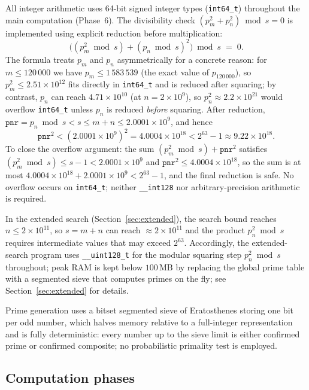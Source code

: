 \documentclass{amsart}
\theoremstyle{definition}
\theoremstyle{remark}
\numberwithin{equation}{section}
\begin{document}
All integer arithmetic uses 64-bit signed integer types
(\texttt{int64\_t}) throughout the main computation (Phase~6).
The divisibility check $(p_m^2 + p_n^2) \bmod s = 0$ is implemented
using explicit reduction before multiplication:
\[
\bigl((p_m^2 \bmod s) + (p_n \bmod s)^2\bigr) \bmod s \;=\; 0.
\]
The formula treats $p_m$ and $p_n$ asymmetrically for a concrete
reason: for $m \leq 120\,000$ we have $p_m \leq 1\,583\,539$
(the exact value of $p_{120\,000}$),
so $p_m^2 \leq 2.51 \times 10^{12}$ fits directly in \texttt{int64\_t}
and is reduced after squaring; by contrast, $p_n$ can reach
$4.71 \times 10^{10}$ (at $n = 2 \times 10^9$),
so $p_n^2 \approx 2.2 \times 10^{21}$ would
overflow \texttt{int64\_t} unless $p_n$ is reduced \emph{before}
squaring.
After reduction, $\mathtt{pnr} = p_n \bmod s < s \leq m + n \leq
2.0001 \times 10^9$, and hence
\[
\mathtt{pnr}^2 < (2.0001 \times 10^9)^2
= 4.0004 \times 10^{18}
< 2^{63} - 1 \approx 9.22 \times 10^{18}.
\]
To close the overflow argument: the sum
$(p_m^2 \bmod s) + \mathtt{pnr}^2$ satisfies
$(p_m^2 \bmod s) \leq s - 1 < 2.0001 \times 10^9$
and $\mathtt{pnr}^2 \leq 4.0004 \times 10^{18}$,
so the sum is at most $4.0004 \times 10^{18} + 2.0001 \times 10^9
< 2^{63} - 1$, and the final reduction is safe.
No overflow occurs on \texttt{int64\_t}; neither \texttt{\_\_int128}
nor arbitrary-precision arithmetic is required.

In the extended search (Section~\ref{sec:extended}), the search bound
reaches $n \leq 2 \times 10^{11}$, so
$s = m + n$ can reach $\approx 2 \times 10^{11}$ and the
product $p_n^2 \bmod s$ requires intermediate values that may exceed
$2^{63}$.
Accordingly, the extended-search program uses \texttt{\_\_uint128\_t}
for the modular squaring step $p_n^2 \bmod s$ throughout;
peak RAM is kept below $100$\,MB by replacing the global prime
table with a segmented sieve that computes primes on the fly;
see Section~\ref{sec:extended} for details.

Prime generation uses a bitset segmented sieve of Eratosthenes
storing one bit per odd number, which halves memory relative to a
full-integer representation and is fully deterministic: every number
up to the sieve limit is either confirmed prime or confirmed composite;
no probabilistic primality test is employed.

\subsection{Computation phases}
\end{document}
